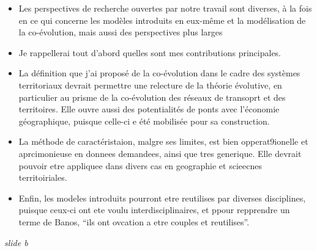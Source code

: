 \documentclass[12pt]{article}
\begin{document}
\begin{itemize}
	\item Les perspectives de recherche ouvertes par notre travail sont diverses, à la fois en ce qui concerne les modèles introduits en eux-même et la modélisation de la co-évolution, mais aussi des perspectives plus larges
	\item Je rappellerai tout d'abord quelles sont mes contributions principales.
	\item La définition que j'ai proposé de la co-évolution dans le cadre des systèmes territoriaux devrait permettre une relecture de la théorie évolutive, en particulier au prisme de la co-évolution des réseaux de transoprt et des territoires. Elle ouvre aussi des potentialités de ponts avec l'économie géographique, puisque celle-ci e été mobilisée pour sa construction.
	\item La méthode de caractéristaion, malgre ses limites, est bien opperat9ionelle et aprcimonieuse en donnees demandees, ainsi que tres generique. Elle devrait pouvoir etre appliquee dans divers cas en geographie et scieecnes territoiriales.
	\item Enfin, les modeles introduits pourront etre reutilises par diverses disciplines, puisque ceux-ci ont ete voulu interdisciplinaires, et ppour repprendre un terme de Banos, ``ils ont ovcation a etre couples et reutilises''.
\end{itemize}

\newpage

\textit{slide b}
\end{document}
